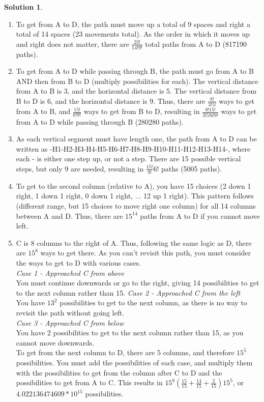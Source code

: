 \documentclass{article}
\theoremstyle{definition}
\newtheorem*{solution}{Solution}
\begin{document}
\begin{solution}
\end{solution}
\begin{enumerate}[label = \alph*)]
    \item 
    To get from A to D, the path must move up a total of 9 spaces and right a total of 14 spaces (23 movements total). As the order in which it moves up and right does not matter, there are $\frac{23!}{14!9!}$ total paths from A to D (817190 paths).
    
    \item
    To get from A to D while passing through B, the path must go from A to B AND then from B to D (multiply possibilities for each). The vertical distance from A to B is 3, and the horizontal distance is 5. The vertical distance from B to D is 6, and the horizontal distance is 9. Thus, there are $\frac{8!}{3!5!}$ ways to get from A to B, and $\frac{15!}{6!9!}$ ways to get from B to D, resulting in $\frac{8!15!}{3!5!6!9!}$ ways to get from A to D while passing through B (280280 paths).
    
    \item
    As each vertical segment must have length one, the path from A to D can be written as -H1-H2-H3-H4-H5-H6-H7-H8-H9-H10-H11-H12-H13-H14-, where each - is either one step up, or not a step. There are 15 possible vertical steps, but only 9 are needed, resulting in $\frac{15!}{9!}{6!}$ paths (5005 paths).
    
    \item
    To get to the second column (relative to A), you have 15 choices (2 down 1 right, 1 down 1 right, 0 down 1 right, ... 12 up 1 right). This pattern follows (different range, but 15 choices to move right one column) for all 14 columns between A and D. Thus, there are $15^{14}$ paths from A to D if you cannot move left.
    
    \item
    C is 8 columns to the right of A. Thus, following the same logic as D, there are $15^8$ ways to get there. As you can't revisit this path, you must consider the ways to get to D with various cases.\\
    \emph{Case 1 - Approached C from above}\\
    You must continue downwards or go to the right, giving 14 possibilities to get to the next column rather than 15.
    \emph{Case 2 - Approached C from the left}\\
    You have $13^2$ possibilities to get to the next column, as there is no way to revisit the path without going left.\\
    \emph{Case 3 - Approached C from below}\\
    You have 2 possibilities to get to the next column rather than 15, as you cannot move downwards.\\
    To get from the next column to D, there are 5 columns, and therefore $15^5$ possibilities.
    You must add the possibilities of each case, and multiply them with the possibilities to get from the column after C to D and the possibilities to get from A to C. This results in $15^8(\frac{15}{15}+\frac{14}{15}+\frac{2}{15})15^5$, or $4.022136474609*10^{15}$ possibilities.
    

\end{enumerate}
\end{document}
